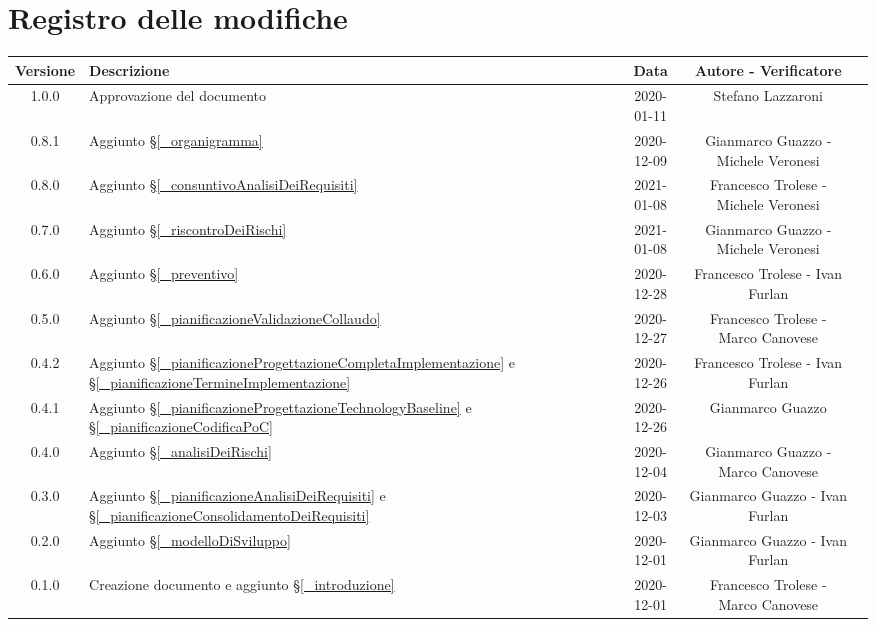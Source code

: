\section*{Registro delle modifiche}

\begin{center}
	\begin{longtable}{|c|p{5cm}|c|c|c|}
		\hline
		\rowcolor{lighter-grayer}
		\textbf{Versione} & \textbf{Descrizione} & \textbf{Data} & \textbf{Autore - Verificatore} \\
		\hline
		\endfirsthead


		\hline
		1.0.0 & Approvazione del documento & 2020-01-11 & Stefano Lazzaroni \\
		0.8.1 & Aggiunto \S\ref{_organigramma} & 2020-12-09 & Gianmarco Guazzo - Michele Veronesi \\
		0.8.0 & Aggiunto \S\ref{_consuntivoAnalisiDeiRequisiti} & 2021-01-08 & Francesco Trolese - Michele Veronesi \\
		0.7.0 & Aggiunto \S\ref{_riscontroDeiRischi} & 2021-01-08 & Gianmarco Guazzo - Michele Veronesi \\
		0.6.0 & Aggiunto \S\ref{_preventivo} & 2020-12-28 & Francesco Trolese - Ivan Furlan \\
		0.5.0 & Aggiunto \S\ref{_pianificazioneValidazioneCollaudo} & 2020-12-27 & Francesco Trolese - Marco Canovese \\
		0.4.2 & Aggiunto \S\ref{_pianificazioneProgettazioneCompletaImplementazione} e \S\ref{_pianificazioneTermineImplementazione} & 2020-12-26 & Francesco Trolese - Ivan Furlan \\
		0.4.1 & Aggiunto \S\ref{_pianificazioneProgettazioneTechnologyBaseline} e \S\ref{_pianificazioneCodificaPoC} & 2020-12-26 & Gianmarco Guazzo \\
		0.4.0 & Aggiunto \S\ref{_analisiDeiRischi} & 2020-12-04 & Gianmarco Guazzo - Marco Canovese \\
		0.3.0 & Aggiunto \S\ref{_pianificazioneAnalisiDeiRequisiti} e \S\ref{_pianificazioneConsolidamentoDeiRequisiti} & 2020-12-03 & Gianmarco Guazzo - Ivan Furlan \\
		0.2.0 & Aggiunto \S\ref{_modelloDiSviluppo} & 2020-12-01 & Gianmarco Guazzo - Ivan Furlan \\
		0.1.0 & Creazione documento e aggiunto \S\ref{_introduzione} & 2020-12-01 & Francesco Trolese - Marco Canovese \\
		\hline
	\end{longtable}
\end{center}
